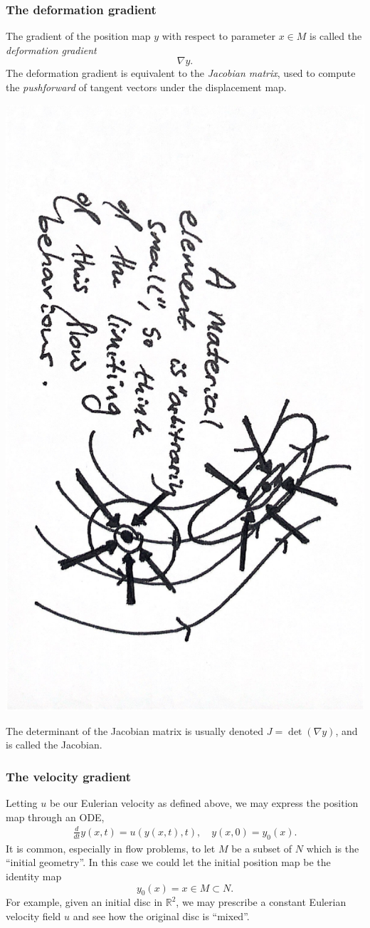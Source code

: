\subsubsection{The deformation gradient}
The gradient of the position map $y$ with respect to parameter $x \in M$ is called the \textit{deformation gradient}
\begin{equation}\label{deformation_gradient}
    \nabla y.
\end{equation}
The deformation gradient is equivalent to the \textit{Jacobian matrix}, used to compute the \textit{pushforward}
of tangent vectors under the displacement map.

\begin{center}
\includegraphics[angle=90,page=4,width=0.5\linewidth]{figures/2.pdf}
\end{center}

The determinant of the Jacobian matrix is usually denoted $J = \det(\nabla y)$, and is called the Jacobian.

\subsubsection{The velocity gradient}
Letting $u$ be our Eulerian velocity as defined above, we may express the position map through an ODE,
\begin{equation}\label{position_map_ode}
\begin{split}
    \frac{d}{dt} y(x, t) = u(y(x, t), t),\quad
    y(x, 0) = y_0(x).
\end{split}
\end{equation}
It is common, especially in flow problems, to let $M$ be a subset of $N$ which is the ``initial geometry''.
In this case we could let the initial position map be the identity map
    $$y_0(x) = x \in M \subset N.$$
For example, given an initial disc in $\mathbb{R}^2$, we may prescribe a constant Eulerian velocity field $u$ and
see how the original disc is ``mixed''.

